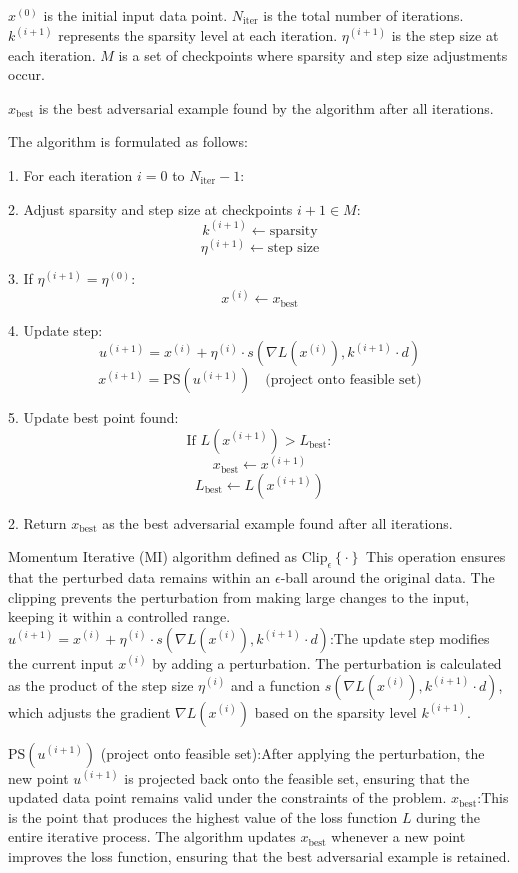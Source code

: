\( x^{(0)} \) is the initial input data point.  
\( N_{\text{iter}} \) is the total number of iterations.  
\( k^{(i+1)} \) represents the sparsity level at each iteration.  
\( \eta^{(i+1)} \) is the step size at each iteration.  
\( M \) is a set of checkpoints where sparsity and step size adjustments occur.

\( x_{\text{best}} \) is the best adversarial example found by the algorithm after all iterations.

The algorithm is formulated as follows:

1. For each iteration \( i = 0 \) to \( N_{\text{iter}} - 1 \):

    2. Adjust sparsity and step size at checkpoints \( i + 1 \in M \):
       \[
       k^{(i+1)} \leftarrow \text{sparsity}
       \]
       \[
       \eta^{(i+1)} \leftarrow \text{step size}
       \]
       
    3. If \( \eta^{(i+1)} = \eta^{(0)} \):
       \[
       x^{(i)} \leftarrow x_{\text{best}}
       \]
       
    4. Update step:
       \[
       u^{(i+1)} = x^{(i)} + \eta^{(i)} \cdot s(\nabla L(x^{(i)}), k^{(i+1)} \cdot d)
       \]
       \[
       x^{(i+1)} = \text{PS}(u^{(i+1)}) \quad \text{(project onto feasible set)}
       \]
       
    5. Update best point found:
       \[
       \text{If } L(x^{(i+1)}) > L_{\text{best}}:
       \]
       \[
       x_{\text{best}} \leftarrow x^{(i+1)}
       \]
       \[
       L_{\text{best}} \leftarrow L(x^{(i+1)})
       \]

2. Return \( x_{\text{best}} \) as the best adversarial example found after all iterations.

Momentum Iterative (MI) algorithm defined as 
\( \text{Clip}_{\epsilon} \left\{ \cdot \right\} \) This operation ensures that the perturbed data remains within an \( \epsilon \)-ball around the original data. The clipping prevents the perturbation from making large changes to the input, keeping it within a controlled range.
\( u^{(i+1)} = x^{(i)} + \eta^{(i)} \cdot s(\nabla L(x^{(i)}), k^{(i+1)} \cdot d) \):The update step modifies the current input \( x^{(i)} \) by adding a perturbation. The perturbation is calculated as the product of the step size \( \eta^{(i)} \) and a function \( s(\nabla L(x^{(i)}), k^{(i+1)} \cdot d) \), which adjusts the gradient \( \nabla L(x^{(i)}) \) based on the sparsity level \( k^{(i+1)} \).
  
\( \text{PS}(u^{(i+1)}) \) (project onto feasible set):After applying the perturbation, the new point \( u^{(i+1)} \) is projected back onto the feasible set, ensuring that the updated data point remains valid under the constraints of the problem.
\( x_{\text{best}} \):This is the point that produces the highest value of the loss function \( L \) during the entire iterative process. The algorithm updates \( x_{\text{best}} \) whenever a new point improves the loss function, ensuring that the best adversarial example is retained.
